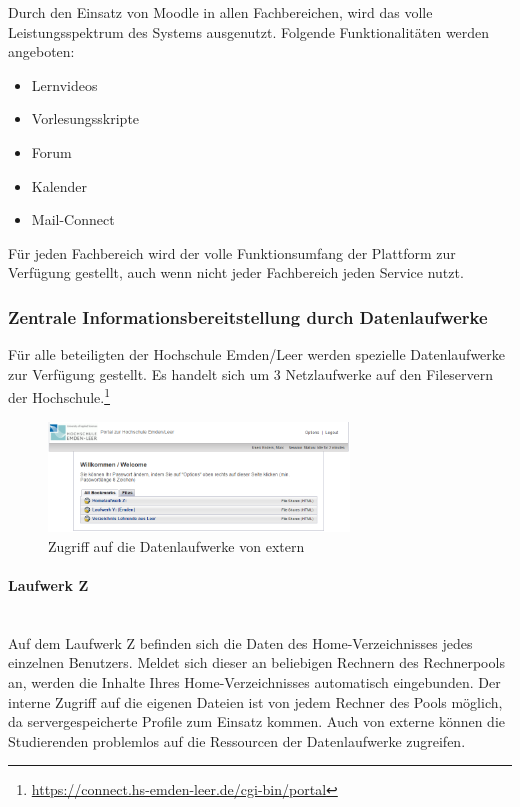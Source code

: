 Durch den Einsatz von Moodle in allen Fachbereichen, wird das volle Leistungsspektrum des Systems ausgenutzt. Folgende Funktionalitäten werden angeboten:
\begin{itemize}
	\item Lernvideos
	\item Vorlesungsskripte
	\item Forum
	\item Kalender
	\item Mail-Connect
\end{itemize}

Für jeden Fachbereich wird der volle Funktionsumfang der Plattform zur Verfügung gestellt, auch wenn nicht jeder Fachbereich jeden Service nutzt.

\subsubsection{Zentrale Informationsbereitstellung durch Datenlaufwerke}
Für alle beteiligten der Hochschule Emden/Leer werden spezielle Datenlaufwerke zur Verfügung gestellt. Es handelt sich um 3 Netzlaufwerke auf den Fileservern der Hochschule.\footnote{\url{https://connect.hs-emden-leer.de/cgi-bin/portal}}

\begin{figure}[h!]
	\centering
	\includegraphics[width=8cm]{kapitel/gruppe2/bilder/zugriff_auf_laufwerke_extern}
	\caption{Zugriff auf die Datenlaufwerke von extern}
	\label{fig_zugriff_datenlaufwerke_extern}
\end{figure}


\paragraph{Laufwerk Z}\mbox{} \\
Auf dem Laufwerk Z befinden sich die Daten des Home-Verzeichnisses jedes einzelnen Benutzers. Meldet sich dieser an beliebigen Rechnern des Rechnerpools an, werden die Inhalte Ihres Home-Verzeichnisses automatisch eingebunden. Der interne Zugriff auf die eigenen Dateien ist von jedem Rechner des Pools möglich, da servergespeicherte Profile zum Einsatz kommen. Auch von externe können die Studierenden problemlos auf die Ressourcen der Datenlaufwerke zugreifen.

